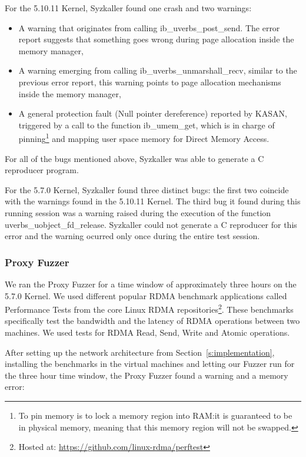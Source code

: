 For the 5.10.11 Kernel, Syzkaller found one crash and two warnings:
\begin{itemize}
  \item A warning that originates from calling ib\_uverbs\_post\_send. The error report suggests that something goes wrong during page allocation inside the memory manager, %
  \item A warning emerging from calling ib\_uverbs\_unmarshall\_recv, similar to the previous error report, this warning points to page allocation mechanisms inside the memory manager,
  \item A general protection fault (Null pointer dereference) reported by KASAN, triggered by a call to the function ib\_umem\_get, which is in charge of pinning\footnote{To pin memory is to lock a memory region into RAM:\@ it is guaranteed to be in physical memory, meaning that this memory region will not be swapped\cite{kerriskLinuxProgrammingInterface2010}.} and mapping user space memory for Direct Memory Access.  %
\end{itemize}

For all of the bugs mentioned above, Syzkaller was able to generate a C reproducer program.

For the 5.7.0 Kernel, Syzkaller found three distinct bugs: the first two coincide with the warnings found in the 5.10.11 Kernel.
The third bug it found during this running session was a warning raised during the execution of the function uverbs\_uobject\_fd\_release.
Syzkaller could not generate a C reproducer for this error and the warning ocurred only once during the entire test session.

\subsubsection{Proxy Fuzzer}

We ran the Proxy Fuzzer for a time window of approximately three hours on the 5.7.0 Kernel.
We used different popular RDMA benchmark applications called Performance Tests from the core
Linux RDMA repositories\footnote{Hosted at: \url{https://github.com/linux-rdma/perftest}}. These benchmarks
specifically test the bandwidth and the latency of RDMA operations between two machines.
We used tests for RDMA Read, Send, Write and Atomic operations.

After setting up the network architecture from Section~\ref{s:implementation}, installing the benchmarks in the
virtual machines and letting our Fuzzer run for the three hour time window, the Proxy Fuzzer found a warning and a memory error:

